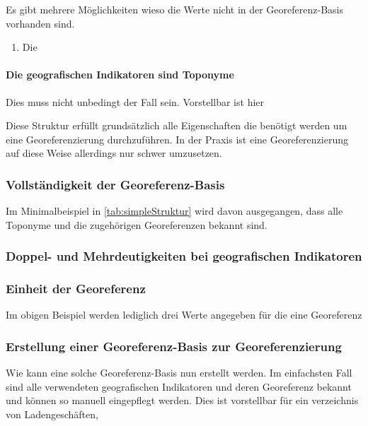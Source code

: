 				Es gibt mehrere Möglichkeiten wieso die Werte nicht in der Georeferenz-Basis vorhanden sind. 

				\begin{enumerate}
				 	\item Die  
				 \end{enumerate} 



			\paragraph{Die geografischen Indikatoren sind Toponyme}

				Dies muss nicht unbedingt der Fall sein. 
				Vorstellbar ist hier 

			Diese Struktur erfüllt grundsätzlich alle Eigenschaften die benötigt werden um eine Georeferenzierung durchzuführen. 
			In der Praxis ist eine Georeferenzierung auf diese Weise allerdings nur schwer umzusetzen.

			\subsubsection{Vollständigkeit der Georeferenz-Basis} 

				Im Minimalbeispiel in \ref{tab:simpleStruktur} wird davon ausgegangen, dass alle Toponyme und die zugehörigen Georeferenzen bekannt sind.		

			\subsubsection{Doppel- und Mehrdeutigkeiten bei geografischen Indikatoren} 



			\subsubsection{Einheit der Georeferenz} 


			Im obigen Beispiel werden lediglich drei Werte angegeben für die eine Georeferenz 

			\subsubsection{Erstellung einer Georeferenz-Basis zur Georeferenzierung}

				Wie kann eine solche Georeferenz-Basis nun erstellt werden.
				Im einfachsten Fall sind alle verwendeten geografischen Indikatoren und deren Georeferenz bekannt und können so manuell eingepflegt werden.
				Dies ist vorstellbar für ein verzeichnis von Ladengeschäften,   

